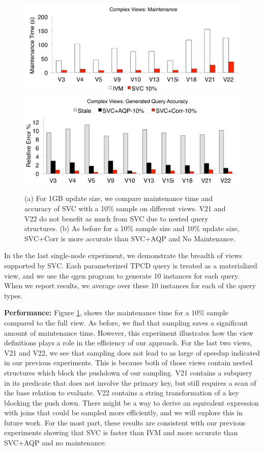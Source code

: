 \begin{figure}[t]\vspace{-2em}
\centering
 \includegraphics[scale=0.10]{exp/msqv_1.pdf}
 \includegraphics[scale=0.10]{exp/msqv_2.pdf}
 \caption{(a) For 1GB update size, we compare maintenance time and accuracy of SVC with a 10\% sample on different views. V21 and V22 do not benefit as much from SVC due to nested query structures. (b) As before for a 10\% sample size and 10\% update size, SVC+Corr is more accurate than SVC+AQP and No Maintenance.  \label{exp3-acc}}
\end{figure}
In the the last single-node experiment, we demonstrate the breadth of views supported by SVC.
Each parameterized TPCD query is treated as a materialized view, and we use the \textsf{qgen} program 
to generate 10 instances for each query.
When we report results, we average over these 10 instances for each of the query types.

\textbf{Performance: }
Figure \ref{exp3-acc}, shows the maintenance time for a 10\% sample compared to the full view.
As before, we find that sampling saves a significant amount of maintenance time.
However, this experiment illustrates how the view definitions plays a role in the efficiency of our approach.
For the last two views, V21 and V22, we see that sampling does not lead to as large of speedup indicated in our previous experiments.  
This is because both of those views contain nested structures which block the pushdown of our sampling.
V21 contains a subquery in its predicate that does not involve the primary key, but still requires a scan of the base relation to evaluate.
V22 contains a string transformation of a key blocking the push down.
There might be a way to derive an equivalent expression with joins that could be sampled more efficiently, and we will explore this in future work.
For the most part, these results are consistent with our previous experiments showing that SVC is faster than IVM and more accurate than SVC+AQP and no maintenance.


